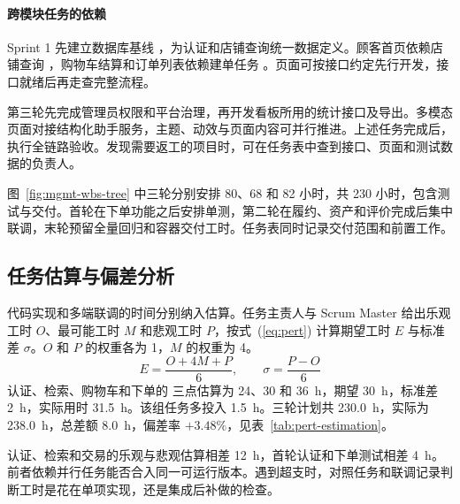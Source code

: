 \paragraph{跨模块任务的依赖}
Sprint 1 先建立数据库基线 ，为认证和店铺查询统一数据定义。顾客首页依赖店铺查询 ，购物车结算和订单列表依赖建单任务 。页面可按接口约定先行开发，接口就绪后再走查完整流程。

第三轮先完成管理员权限和平台治理，再开发看板所用的统计接口及导出。多模态页面对接结构化助手服务，主题、动效与页面内容可并行推进。上述任务完成后， 执行全链路验收。发现需要返工的项目时，可在任务表中查到接口、页面和测试数据的负责人。

图~\ref{fig:mgmt-wbs-tree} 中三轮分别安排 80、68 和 82 小时，共 230 小时，包含测试与交付。首轮在下单功能之后安排单测，第二轮在履约、资产和评价完成后集中联调，末轮预留全量回归和容器交付工时。任务表同时记录交付范围和前置工作。

\subsection{任务估算与偏差分析}

代码实现和多端联调的时间分别纳入估算。任务主责人与 Scrum Master 给出乐观工时 $O$、最可能工时 $M$ 和悲观工时 $P$，按式~(\ref{eq:pert}) 计算期望工时 $E$ 与标准差 $\sigma$。$O$ 和 $P$ 的权重各为 1，$M$ 的权重为 4。
\begin{equation}\label{eq:pert}
  E = \frac{O + 4M + P}{6}, \qquad \sigma = \frac{P - O}{6}
\end{equation}
认证、检索、购物车和下单的  三点估算为 24、30 和 36~h，期望 30~h，标准差 2~h，实际用时 31.5~h。该组任务多投入 1.5~h。三轮计划共 230.0~h，实际为 238.0~h，总差额 8.0~h，偏差率 $+3.48\%$，见表~\ref{tab:pert-estimation}。

认证、检索和交易的乐观与悲观估算相差 12~h，首轮认证和下单测试相差 4~h。前者依赖并行任务能否合入同一可运行版本。遇到超支时，对照任务和联调记录判断工时是花在单项实现，还是集成后补做的检查。

